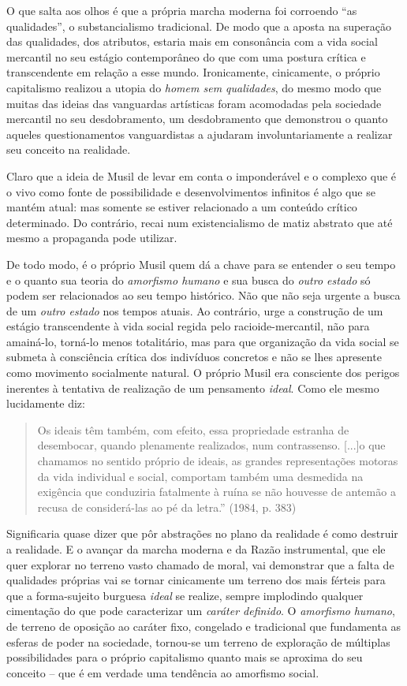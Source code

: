 O que salta aos olhos é que a própria marcha moderna foi corroendo ``as
qualidades'', o substancialismo tradicional. De modo que a aposta na
superação das qualidades, dos atributos, estaria mais em consonância com
a vida social mercantil no seu estágio contemporâneo do que com uma
postura crítica e transcendente em relação a esse mundo. Ironicamente,
cinicamente, o próprio capitalismo realizou a utopia do \emph{homem sem
qualidades}, do mesmo modo que muitas das ideias das vanguardas
artísticas foram acomodadas pela sociedade mercantil no seu
desdobramento, um desdobramento que demonstrou o quanto aqueles
questionamentos vanguardistas a ajudaram involuntariamente a realizar
seu conceito na realidade.

Claro que a ideia de Musil de levar em conta o imponderável e o complexo
que é o vivo como fonte de possibilidade e desenvolvimentos infinitos é
algo que se mantém atual: mas somente se estiver relacionado a um
conteúdo crítico determinado. Do contrário, recai num existencialismo de
matiz abstrato que até mesmo a propaganda pode utilizar.

De todo modo, é o próprio Musil quem dá a chave para se entender o seu
tempo e o quanto sua teoria do \emph{amorfismo humano} e sua busca do
\emph{outro estado} só podem ser relacionados ao seu tempo histórico.
Não que não seja urgente a busca de um \emph{outro estado} nos tempos
atuais. Ao contrário, urge a construção de um estágio transcendente à
vida social regida pelo racioide-mercantil, não para amainá-lo, torná-lo
menos totalitário, mas para que organização da vida social se submeta à
consciência crítica dos indivíduos concretos e não se lhes apresente
como movimento socialmente natural. O próprio Musil era consciente dos
perigos inerentes à tentativa de realização de um pensamento
\emph{ideal}. Como ele mesmo lucidamente diz:

\begin{quote}
Os ideais têm também, com efeito, essa propriedade estranha de
desembocar, quando plenamente realizados, num contrassenso. {[}...{]}o
que chamamos no sentido próprio de ideais, as grandes representações
motoras da vida individual e social, comportam também uma desmedida na
exigência que conduziria fatalmente à ruína se não houvesse de antemão a
recusa de considerá-las ao pé da letra.'' (1984, p. 383)
\end{quote}

Significaria quase dizer que pôr abstrações no plano da realidade é como
destruir a realidade. E o avançar da marcha moderna e da Razão
instrumental, que ele quer explorar no terreno vasto chamado de moral,
vai demonstrar que a falta de qualidades próprias vai se tornar
cinicamente um terreno dos mais férteis para que a forma-sujeito
burguesa \emph{ideal} se realize, sempre implodindo qualquer cimentação
do que pode caracterizar um \emph{caráter definido}. O \emph{amorfismo}
\emph{humano}, de terreno de oposição ao caráter fixo, congelado e
tradicional que fundamenta as esferas de poder na sociedade, tornou-se
um terreno de exploração de múltiplas possibilidades para o próprio
capitalismo quanto mais se aproxima do seu conceito -- que é em verdade
uma tendência ao amorfismo social.

